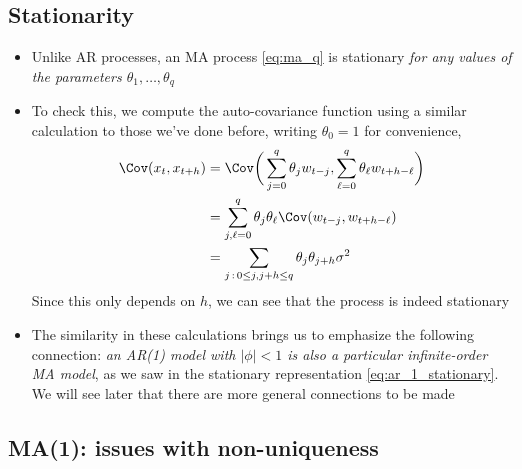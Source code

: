\documentclass{article}
\begin{document}
\subsection{Stationarity}

\begin{itemize}
\item Unlike AR processes, an MA process \eqref{eq:ma_q} is stationary \emph{for
    any values of the parameters $\theta_1,\dots,\theta_q$}

\item To check this, we compute the auto-covariance function using a similar
  calculation to those we've done before, writing $\theta_0 = 1$ for
  convenience,
  \begin{align}
  \nonumber
  \Cov(x_t, x_{t+h}) &= \Cov\bigg( \sum_{j=0}^q \theta_j w_{t-j}, 
  \sum_{\ell=0}^q \theta_\ell w_{t+h-\ell} \bigg) \\
  \nonumber
  &= \sum_{j,\ell=0}^q \theta_j \theta_\ell \Cov( w_{t-j}, w_{t+h-\ell} ) \\
  \label{eq:ma_q_auto_cov}
  &= \sum_{j \,:\, 0 \leq j,  j +h \leq q} \theta_j \theta_{j+h} \sigma^2
  \end{align}
  Since this only depends on $h$, we can see that the process is indeed
  stationary 

\item The similarity in these calculations brings us to emphasize the following
  connection: \emph{an AR(1) model with $|\phi| < 1$ is also a particular
    infinite-order MA model}, as we saw in the stationary representation
  \eqref{eq:ar_1_stationary}. We will see later that there are more general
  connections to be made 
\end{itemize}

\subsection{MA(1): issues with non-uniqueness}
\end{document}
